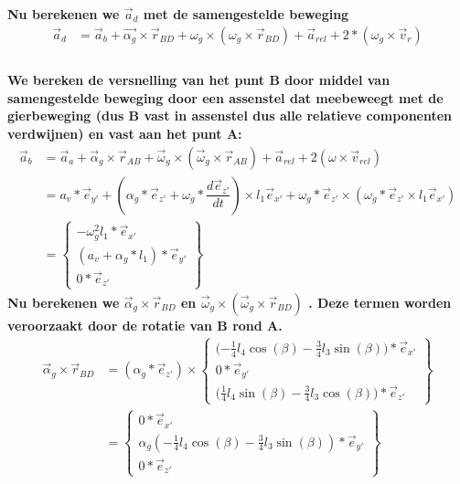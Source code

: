 \documentclass[a4paper,10pt]{article}
\begin{document}
\textbf{Nu berekenen we $\vec{a}_d$ met de samengestelde beweging}\\
\begin{equation}
	\begin{aligned}
		\vec{a}_d &= \vec{a}_b + \vec{\alpha_g} \times  \vec{r}_{BD} + \omega_g \times (\omega_g \times \vec{r}_{BD}) + \vec{a}_{rel} + 2* (\omega_g \times \vec{v}_r)\\
	\end{aligned}
\end{equation}
\\
\textbf{We bereken de versnelling van het punt B door middel van samengestelde beweging door een assenstel dat meebeweegt met de gierbeweging (dus B vast in assenstel dus alle relatieve componenten verdwijnen) en vast aan het punt A: }\\
\begin{equation}
\begin{aligned}
\vec{a}_b &= \vec{a}_a + \vec{\alpha}_g  \times \vec{r}_{AB} + \vec{\omega}_g \times (\vec{\omega}_g \times \vec{r}_{AB}) + \vec{a}_{rel} + 2(\omega \times \vec{v}_{rel})\\
&= a_v * \vec{e}_{y'} + (\alpha_g * \vec{e}_{z'} + \omega_g *\dfrac{d\vec{e}_{z'}}{dt}) \times l_1 \vec{e}_{x'} + \omega_{g} *\vec{e}_{z'} \times (\omega_{g} *\vec{e}_{z'}  \times l_1 \vec{e}_{x'})\\
& = \begin{Bmatrix}
-\omega^{2}_g l_1 * \vec{e}_{x'}\\
(a_v + \alpha_g * l_1)*\vec{e}_{y'}\\
0 * \vec{e}_{z'}
\end{Bmatrix}
\end{aligned}
\end{equation}
\textbf{Nu berekenen we $\vec{\alpha}_g \times \vec{r}_{BD}$ en $\vec{\omega}_g \times (\vec{\omega}_g \times \vec{r}_{BD})$ . Deze termen worden veroorzaakt door de rotatie van B rond A. }
\begin{equation}
\begin{aligned}
	\vec{\alpha}_g \times \vec{r}_{BD}  &= (\alpha_g * \vec{e}_{z'}) \times \begin{Bmatrix}
	\Big({-\frac{1}{4}} l_4 \cos(\beta)-\frac{3}{4} l_3 \sin(\beta)\Big)*\vec{e}_{x'}\\
	0 * \vec{e}_{y'}\\
	\Big (\frac{1}{4} l_4 \sin(\beta) - \frac{3}{4} l_3 \cos(\beta)\Big) * \vec{e}_{z'}
	\end{Bmatrix}\\
	&= \begin{Bmatrix}
	0*\vec{e}_{x'}\\
	\alpha_g ({-\frac{1}{4}} l_4 \cos(\beta)-\frac{3}{4} l_3 \sin(\beta))*\vec{e}_{y'}\\
	0*\vec{e}_{z'}
	\end{Bmatrix}
\end{aligned}
\end{equation}
\end{document}
